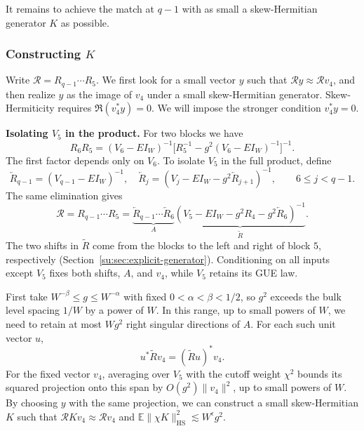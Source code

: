 \documentclass[11pt]{article}
\numberwithin{equation}{section}
\theoremstyle{remark}
\newcommand{\E}{\mathbb E}
\newcommand{\HS}{\mathrm{HS}}
\begin{document}
It remains to achieve the match at $q-1$ with as small a
skew-Hermitian generator $K$ as possible.

\subsubsection{Constructing \texorpdfstring{$K$}{K}}
\label{sec:intro-small-generator}

Write $\mathcal R=R_{q-1}\cdots R_5$. We first look for a small
vector $y$ such that $\mathcal Ry\approx\mathcal Rv_4$, and then
realize $y$ as the image of $v_4$ under a small skew-Hermitian generator.
Skew-Hermiticity requires $\Re(v_4^*y)=0$. We will
impose the stronger condition $v_4^*y=0$.

\textbf{Isolating $V_5$ in the product.}
For two blocks we have
\[
 R_6R_5
 =(V_6-EI_W)^{-1}
   \bigl[R_5^{-1}-g^2(V_6-EI_W)^{-1}\bigr]^{-1}.
\]
The first factor depends only on $V_6$. To isolate $V_5$ in the
full product, define
\[
 \overleftarrow R_{q-1}=(V_{q-1}-EI_W)^{-1},\quad  
 \overleftarrow R_j
 =(V_j-EI_W-g^2\overleftarrow R_{j+1})^{-1},
 \qquad 6\le j<q-1.
\]
The same elimination gives
\begin{equation}\label{us:eq:cavity}
 \mathcal R=R_{q-1}\cdots R_5
 =\underbrace{\overleftarrow R_{q-1}\cdots\overleftarrow R_6}_{A}
  \underbrace{(V_5-EI_W-g^2R_4-g^2\overleftarrow R_6)^{-1}}_{\widetilde R}.
\end{equation}
The two shifts in $\widetilde R$ come from the blocks to the left
and right of block $5$, respectively (Section~\ref{su:sec:explicit-generator}).
Conditioning on all inputs except $V_5$ fixes both shifts, $A$, and
$v_4$, while $V_5$ retains its GUE law.

First take $W^{-\beta}\le g\le W^{-\alpha}$ with fixed
$0<\alpha<\beta<1/2$, so $g^2$ exceeds the bulk level spacing $1/W$
by a power of $W$. In this range, up to small powers of $W$, we need
to retain at most $Wg^2$ right singular directions of $A$.
For each such unit vector $u$,
\[
 u^*\widetilde Rv_4=(\widetilde Ru)^*v_4.
\]
For the fixed vector $v_4$, averaging over $V_5$ with the cutoff
weight $\chi^2$ bounds its squared projection onto this span by
$O(g^2)\|v_4\|^2$, up to small powers of $W$.
By choosing $y$ with the same projection, we can construct
a small skew-Hermitian $K$ such that $\mathcal R Kv_4\approx\mathcal Rv_4$
and $\E\|\chi K\|_{\HS}^2\lesssim W^\epsilon g^2$.
\end{document}
